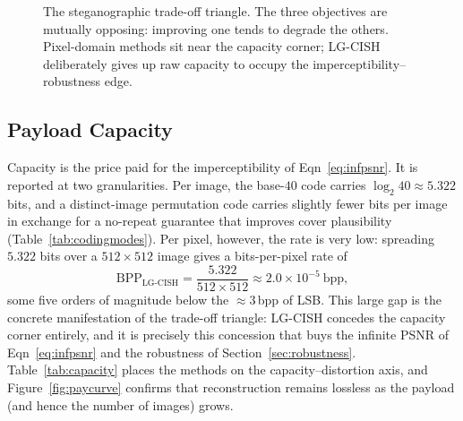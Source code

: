 \documentclass[11pt]{article}
\begin{document}
\begin{figure}[H]
\centering
{}
\caption{The steganographic trade-off triangle. The three objectives are mutually
opposing: improving one tends to degrade the others. Pixel-domain methods sit near
the capacity corner; LG-CISH deliberately gives up raw capacity to occupy the
imperceptibility--robustness edge.}
\label{fig:tradeoff}
\end{figure}

\subsection{Payload Capacity}\label{sec:rescap}
Capacity is the price paid for the imperceptibility of Eqn~\eqref{eq:infpsnr}.
It is reported at two granularities. Per image, the base-$40$ code carries
$\log_2 40\approx5.322$ bits, and a distinct-image permutation code carries slightly
fewer bits per image in exchange for a no-repeat guarantee that improves cover
plausibility (Table~\ref{tab:codingmodes}). Per pixel, however, the rate is very
low: spreading $5.322$ bits over a $512\times512$ image gives a bits-per-pixel rate
of
\begin{equation}
  \mathrm{BPP}_{\text{LG-CISH}}=\frac{5.322}{512\times512}\approx 2.0\times10^{-5}\ \text{bpp},
  \label{eq:bpp}
\end{equation}
some five orders of magnitude below the $\approx 3$\,bpp of LSB. This large gap is
the concrete manifestation of the trade-off triangle: LG-CISH concedes the capacity
corner entirely, and it is precisely this concession that buys the infinite PSNR of
Eqn~\eqref{eq:infpsnr} and the robustness of Section~\ref{sec:robustness}.
Table~\ref{tab:capacity} places the methods on the capacity--distortion axis, and
Figure~\ref{fig:paycurve} confirms that reconstruction remains lossless as the
payload (and hence the number of images) grows.
\end{document}
